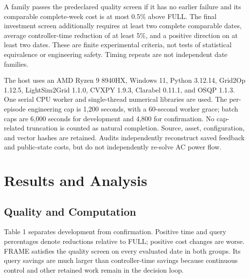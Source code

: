 \documentclass[letterpaper]{article}
\begin{document}
A family passes the predeclared quality screen if it has no earlier failure and its comparable complete-week cost is at most 0.5\% above FULL. The final investment screen additionally requires at least two complete comparable dates, average controller-time reduction of at least 5\%, and a positive direction on at least two dates. These are finite experimental criteria, not tests of statistical equivalence or engineering safety. Timing repeats are not independent date families.


The host uses an AMD Ryzen 9 8940HX, Windows 11, Python 3.12.14, Grid2Op 1.12.5, LightSim2Grid 1.1.0, CVXPY 1.9.3, Clarabel 0.11.1, and OSQP 1.1.3. One serial CPU worker and single-thread numerical libraries are used. The per-episode engineering cap is 1,200 seconds, with a 60-second worker grace; batch caps are 6,000 seconds for development and 4,800 for confirmation. No cap-related truncation is counted as natural completion. Source, asset, configuration, and vector hashes are retained. Audits independently reconstruct saved feedback and public-state costs, but do not independently re-solve AC power flow.


\section{Results and Analysis}

\subsection{Quality and Computation}

Table 1 separates development from confirmation. Positive time and query percentages denote reductions relative to FULL; positive cost changes are worse. FRAME satisfies the quality screen on every evaluated date in both groups. Its query savings are much larger than controller-time savings because continuous control and other retained work remain in the decision loop.
\end{document}
